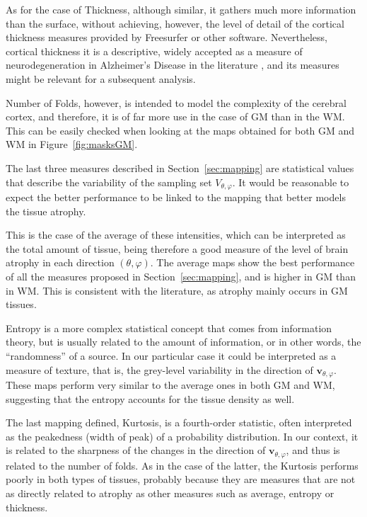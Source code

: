As for the case of Thickness, although similar, it gathers much more information than the surface, without achieving, however, the level of detail of the cortical thickness measures provided by Freesurfer \cite{Fischl2004} or other software. Nevertheless, cortical thickness it is a descriptive, widely accepted as a measure of neurodegeneration in Alzheimer's Disease in the literature \cite{han2006reliability,Fischl2004}, and its measures might be relevant for a subsequent analysis. 

Number of Folds, however, is intended to model the complexity of the cerebral cortex, and therefore, it is of far more use in the case of \ac{GM} than in the \ac{WM}. This can be easily checked when looking at the maps obtained for both \ac{GM} and \ac{WM} in Figure~\ref{fig:masksGM}. 

The last three measures described in Section~\ref{sec:mapping} are statistical values that describe the variability of the sampling set $V_{\theta,\varphi}$. It would be reasonable to expect the better performance to be linked to the mapping that better models the tissue atrophy. 

This is the case of the average of these intensities, which can be interpreted as the total amount of tissue, being therefore a good measure of the level of brain atrophy in each direction $(\theta,\varphi)$. The average maps show the best performance of all the measures proposed in Section~\ref{sec:mapping}, and is higher in \ac{GM} than in \ac{WM}. This is consistent with the literature, as atrophy mainly occurs in \ac{GM} tissues. 

Entropy is a more complex statistical concept that comes from information theory, but is usually related to the amount of information, or in other words, the ``randomness'' of a source. In our particular case it could be interpreted as a measure of texture, that is, the grey-level variability in the direction of $\mathbf{v}_{\theta,\varphi}$. These maps perform very similar to the average ones in both \ac{GM} and \ac{WM}, suggesting that the entropy accounts for the tissue density as well. 

The last mapping defined, Kurtosis, is a fourth-order statistic, often interpreted as the peakedness (width of peak) of a probability distribution. In our context, it is related to the sharpness of the changes in the direction of $\mathbf{v}_{\theta,\varphi}$, and thus is related to the number of folds. As in the case of the latter, the Kurtosis performs poorly in both types of tissues, probably because they are measures that are not as directly related to atrophy as other measures such as average, entropy or thickness. 

